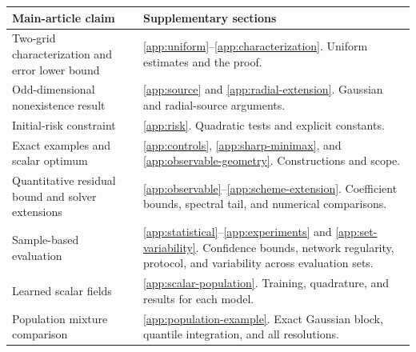 \begin{center}
\begin{tabular}{@{}p{}p{}@{}}
\toprule
Main-article claim & Supplementary sections\\
\midrule
Two-grid characterization and error lower bound
& \ref{app:uniform}--\ref{app:characterization}. Uniform estimates and the proof.\\
Odd-dimensional nonexistence result
& \ref{app:source} and \ref{app:radial-extension}. Gaussian and radial-source arguments.\\
Initial-risk constraint
& \ref{app:risk}. Quadratic tests and explicit constants.\\
Exact examples and scalar optimum
& \ref{app:controls}, \ref{app:sharp-minimax}, and \ref{app:observable-geometry}. Constructions and scope.\\
Quantitative residual bound and solver extensions
& \ref{app:observable}--\ref{app:scheme-extension}. Coefficient bounds, spectral tail, and numerical comparisons.\\
Sample-based evaluation
& \ref{app:statistical}--\ref{app:experiments} and \ref{app:set-variability}. Confidence bounds, network regularity, protocol, and variability across evaluation sets.\\
Learned scalar fields
& \ref{app:scalar-population}. Training, quadrature, and results for each model.\\
Population mixture comparison
& \ref{app:population-example}. Exact Gaussian block, quantile integration, and all resolutions.\\
\bottomrule
\end{tabular}
\end{center}
\setcounter{section}{0}
\renewcommand{\thesection}{S\arabic{section}}
\renewcommand{\thesubsection}{\thesection-\Alph{subsection}}
\setcounter{equation}{0}
\renewcommand{\theequation}{S\arabic{equation}}
\setcounter{theorem}{0}
\renewcommand{\thetheorem}{S\arabic{theorem}}
\setcounter{definition}{0}
\renewcommand{\thedefinition}{S\arabic{definition}}
\setcounter{table}{0}
\renewcommand{\thetable}{S\arabic{table}}
\renewcommand{\thefigure}{S\arabic{figure}}






